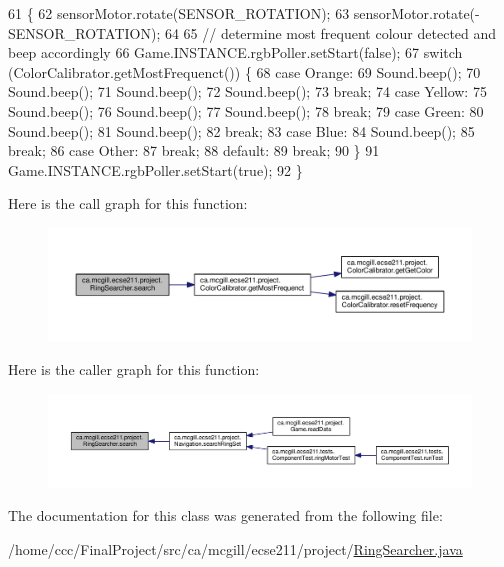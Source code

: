 \begin{DoxyCode}
61                        \{
62     sensorMotor.rotate(SENSOR\_ROTATION);
63     sensorMotor.rotate(-SENSOR\_ROTATION);
64 
65     \textcolor{comment}{// determine most frequent colour detected and beep accordingly}
66     Game.INSTANCE.rgbPoller.setStart(\textcolor{keyword}{false});
67     \textcolor{keywordflow}{switch} (ColorCalibrator.getMostFrequenct()) \{
68       \textcolor{keywordflow}{case} Orange:
69         Sound.beep();
70         Sound.beep();
71         Sound.beep();
72         Sound.beep();
73         \textcolor{keywordflow}{break};
74       \textcolor{keywordflow}{case} Yellow:
75         Sound.beep();
76         Sound.beep();
77         Sound.beep();
78         \textcolor{keywordflow}{break};
79       \textcolor{keywordflow}{case} Green:
80         Sound.beep();
81         Sound.beep();
82         \textcolor{keywordflow}{break};
83       \textcolor{keywordflow}{case} Blue:
84         Sound.beep();
85         \textcolor{keywordflow}{break};
86       \textcolor{keywordflow}{case} Other:
87         \textcolor{keywordflow}{break};
88       \textcolor{keywordflow}{default}:
89         \textcolor{keywordflow}{break};
90     \}
91     Game.INSTANCE.rgbPoller.setStart(\textcolor{keyword}{true});
92   \}
\end{DoxyCode}
Here is the call graph for this function\+:\nopagebreak
\begin{figure}[H]
\begin{center}
\leavevmode
\includegraphics[width=350pt]{classca_1_1mcgill_1_1ecse211_1_1project_1_1_ring_searcher_a7ff5756046a0ce992ed8cb8954139c3b_cgraph}
\end{center}
\end{figure}
Here is the caller graph for this function\+:\nopagebreak
\begin{figure}[H]
\begin{center}
\leavevmode
\includegraphics[width=350pt]{classca_1_1mcgill_1_1ecse211_1_1project_1_1_ring_searcher_a7ff5756046a0ce992ed8cb8954139c3b_icgraph}
\end{center}
\end{figure}


The documentation for this class was generated from the following file\+:\begin{DoxyCompactItemize}
\item 
/home/ccc/\+Final\+Project/src/ca/mcgill/ecse211/project/\hyperlink{_ring_searcher_8java}{Ring\+Searcher.\+java}\end{DoxyCompactItemize}
